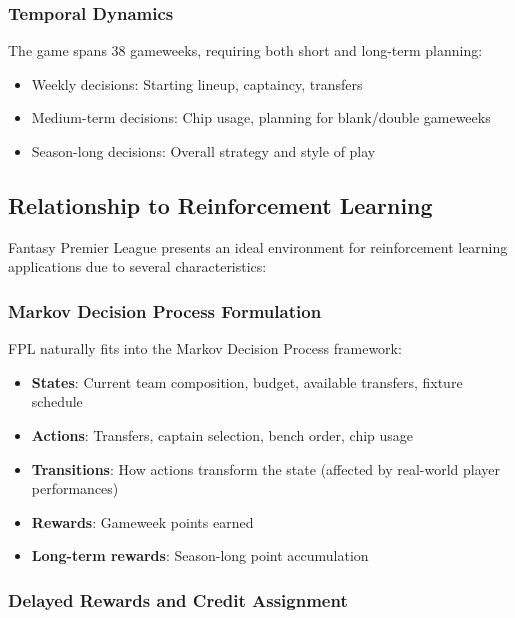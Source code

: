 \subsubsection{Temporal Dynamics}

The game spans 38 gameweeks, requiring both short and long-term planning:
\begin{itemize}
    \item Weekly decisions: Starting lineup, captaincy, transfers
    \item Medium-term decisions: Chip usage, planning for blank/double gameweeks
    \item Season-long decisions: Overall strategy and style of play \cite{constantinou2019}
\end{itemize}

\subsection{Relationship to Reinforcement Learning}

Fantasy Premier League presents an ideal environment for reinforcement learning applications due to several characteristics:

\subsubsection{Markov Decision Process Formulation}

FPL naturally fits into the Markov Decision Process framework:
\begin{itemize}
    \item \textbf{States}: Current team composition, budget, available transfers, fixture schedule
    \item \textbf{Actions}: Transfers, captain selection, bench order, chip usage
    \item \textbf{Transitions}: How actions transform the state (affected by real-world player performances)
    \item \textbf{Rewards}: Gameweek points earned
    \item \textbf{Long-term rewards}: Season-long point accumulation \cite{sutton2018, butler2021}
\end{itemize}

\subsubsection{Delayed Rewards and Credit Assignment}

